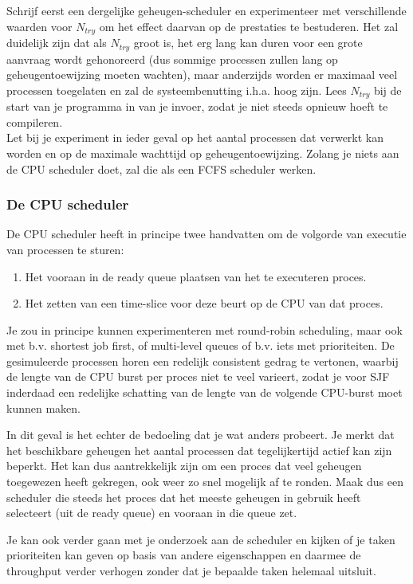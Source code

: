 \documentclass[11pt,a4paper,twoside]{article}
\begin{document}
Schrijf eerst een dergelijke geheugen-scheduler en experimenteer met verschillende waarden voor 
$N_{try}$ om het effect daarvan op de prestaties te bestuderen. Het zal duidelijk zijn dat als
$N_{try}$ groot is, het erg lang kan duren voor een grote aanvraag wordt gehonoreerd (dus sommige processen zullen lang op geheugentoewijzing moeten wachten), maar anderzijds worden er maximaal veel processen 
toegelaten en zal de systeembenutting i.h.a. hoog zijn. Lees $N_{try}$ bij de start van je programma 
in van je invoer, zodat je niet steeds opnieuw hoeft te compileren.\\
Let bij je experiment in ieder geval op het aantal processen dat verwerkt kan worden en op de maximale wachttijd op geheugentoewijzing. Zolang je niets aan de CPU scheduler doet, zal die als een FCFS scheduler werken.

\subsubsection*{De CPU scheduler}

De CPU scheduler heeft in principe twee handvatten om de volgorde van
executie van processen te sturen:
\begin{enumerate}  \item Het vooraan in de ready queue plaatsen van het te executeren
proces.
  \item Het zetten van een time-slice voor deze beurt op de CPU van dat
proces.
\end{enumerate}
Je zou in principe kunnen experimenteren met round-robin scheduling, maar ook
met b.v. shortest job first, of multi-level queues of b.v. iets met prioriteiten. De gesimuleerde processen
horen een redelijk consistent gedrag te vertonen, waarbij de lengte van
de CPU burst per proces niet te veel varieert, zodat je voor SJF inderdaad een redelijke schatting van de lengte van de volgende CPU-burst moet kunnen maken.

In dit geval is het echter de bedoeling dat je wat anders probeert. Je merkt dat het beschikbare geheugen het aantal processen dat tegelijkertijd actief kan zijn beperkt. Het kan dus aantrekkelijk zijn om een
proces dat veel geheugen toegewezen heeft gekregen, ook weer zo snel mogelijk af te ronden. Maak dus een scheduler die steeds het proces dat het meeste geheugen in gebruik heeft selecteert (uit de ready queue) en vooraan in die queue zet.

Je kan ook verder gaan met je onderzoek aan de scheduler en kijken of je taken prioriteiten kan
geven op basis van andere eigenschappen en daarmee de throughput verder verhogen zonder dat je bepaalde
taken helemaal uitsluit.
\end{document}
